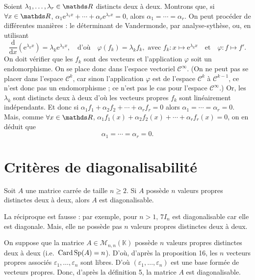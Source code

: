 \begin{exo}
	Soient $\lambda_1, \ldots, \lambda_r \in \R$\/ distincts deux à deux.
	Montrons que, si $\forall x \in \R$, $\alpha_1 \mathrm{e}^{\lambda_1 x} + \cdots + \alpha_r \mathrm{e}^{\lambda_r x} = 0$, alors $\alpha_1 = \cdots = \alpha_r$.
	On peut procéder de différentes manières : le déterminant de {\sc Vandermonde}, par analyse-sythèse, ou, en utilisant \[
		\frac{\mathrm{d}}{\mathrm{d}x}\left( \mathrm{e}^{\lambda_k x} \right) = \lambda_k \mathrm{e}^{\lambda_k x},\quad\text{d'où}\quad\varphi(f_k) = \lambda_k f_k, \text{ avec } f_k : x \mapsto \mathrm{e}^{\lambda_k x}\quad\text{et}\quad\varphi:f\mapsto f'
	.\]
	On doit vérifier que les $f_k$\/ sont des vecteurs et l'application $\varphi$\/ soit un endomorphisme. On se place donc dans l'espace vectoriel $\mathscr{C}^{\infty}$. (On ne peut pas se placer dans l'espace $\mathscr{C}^k$, car sinon l'application $\varphi$\/ est de l'espace $\mathscr{C}^k$\/ à $\mathscr{C}^{k-1}$, ce n'est donc pas un endomorphisme ; ce n'est pas le cas pour l'espace $\mathscr{C}^\infty$.)
	Or, les $\lambda_k$\/ sont distincts deux à deux d'où les vecteurs propres $f_k$\/ sont linéairement indépendants. Et donc si $\alpha_1 f_1 + \alpha_2 f_2 + \cdots + \alpha_r f_r = 0$\/ alors $\alpha_1 = \cdots = \alpha_r=0$.
	Mais, comme $\forall x \in \R$, $\alpha_1 f_1(x) + \alpha_2 f_2(x) + \cdots + \alpha_r f_r(x) = 0$, on en déduit que \[
		\boxed{\alpha_1 = \cdots = \alpha_r = 0.}
	\]
\end{exo}

\section{Critères de diagonalisabilité}

\begin{prop}
	Soit $A$\/ une matrice carrée de taille $n \ge 2$. {\color{red}Si} $A$\/ possède $n$\/ valeurs propres distinctes deux à deux, {\color{red}alors} $A$\/ est diagonalisable.
\end{prop}

\begin{rmkn}
	La réciproque est fausse : par exemple, pour $n > 1$, $7 I_n$\/ est diagonalisable car elle est diagonale. Mais, elle ne possède pas $n$\/ valeurs propres distinctes deux à deux.
\end{rmkn}

\begin{prv}
	On suppose que la matrice $A \in \mathscr{M}_{n,n}(\mathds{K})$\/ possède $n$\/ valeurs propres distinctes deux à deux (i.e.~$\operatorname{Card} \operatorname{Sp}(A) = n$). D'où, d'après la proposition 16, les $n$\/ vecteurs propres associés $\varepsilon_1,\ldots,\varepsilon_n$\/ sont libres. D'où $(\varepsilon_1, \ldots, \varepsilon_n)$\/ est une base formée de vecteurs propres. Donc, d'après la définition 5, la matrice $A$\/ est diagonalisable.
\end{prv}

